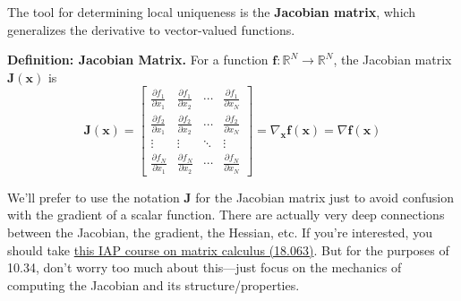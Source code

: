 The tool for determining local uniqueness is the \textbf{Jacobian matrix}, which generalizes the derivative to vector-valued functions.

\begin{definitionBox}
\textbf{Definition: Jacobian Matrix.}
For a function $\mathbf{f}: \mathbb{R}^N \rightarrow \mathbb{R}^N$, the Jacobian matrix $\mathbf{J}(\mathbf{x})$ is
{\renewcommand{\arraystretch}{1.5}
\begin{equation}
\mathbf{J}(\mathbf{x}) = \begin{bmatrix}
\frac{\partial f_1}{\partial x_1} & \frac{\partial f_1}{\partial x_2} & \cdots & \frac{\partial f_1}{\partial x_N} \\
\frac{\partial f_2}{\partial x_1} & \frac{\partial f_2}{\partial x_2} & \cdots & \frac{\partial f_2}{\partial x_N} \\
\vdots & \vdots & \ddots & \vdots \\
\frac{\partial f_N}{\partial x_1} & \frac{\partial f_N}{\partial x_2} & \cdots & \frac{\partial f_N}{\partial x_N}
\end{bmatrix} = \nabla_{\mathbf{x}}\mathbf{f}(\mathbf{x}) = \nabla\mathbf{f}(\mathbf{x})
\end{equation}
}
\end{definitionBox}
We'll prefer to use the notation $\mathbf{J}$ for the Jacobian matrix just to avoid confusion with the gradient of a scalar function. There are actually very deep connections between the Jacobian, the gradient, the Hessian, etc. If you're interested, you should take \href{https://github.com/mitmath/matrixcalc}{this IAP course on matrix calculus (18.063)}. But for the purposes of 10.34, don't worry too much about this---just focus on the mechanics of computing the Jacobian and its structure/properties.

